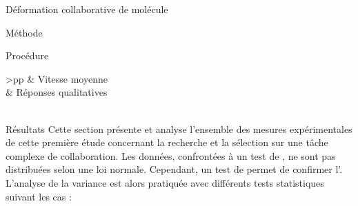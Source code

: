 \documentclass[myfrancais]{mythesis}
\begin{document}
\begin{mychapter}{Déformation collaborative de molécule}
\begin{mysection}{Méthode}
\begin{mysubsection}{Procédure}
\begin{mytable}
\begin{mytabular}{>{\bfseries}p{\exptwofirstcolumn}p{\exptwosecondcolumn}}
																	&  Vitesse moyenne                                                        \\
																	&  Réponses qualitatives                                                  \\
						\mymiddlerule[\heavyrulewidth]
						 \\
						\mybottomrule
					\end{mytabular}
				\end{mytable}
			\end{mysubsection}
		\end{mysection}
		\begin{mysection}{Résultats}
			Cette section présente et analyse l'ensemble des mesures expérimentales de cette première étude concernant la recherche et la sélection sur une tâche complexe de collaboration.
			Les données, confrontées à un test de , ne sont pas distribuées selon une loi normale.
			Cependant, un test de  permet de confirmer l'.
			L'analyse de la variance est alors pratiquée avec différents tests statistiques suivant les cas :

\end{mysection}
\end{mychapter}
\end{document}
